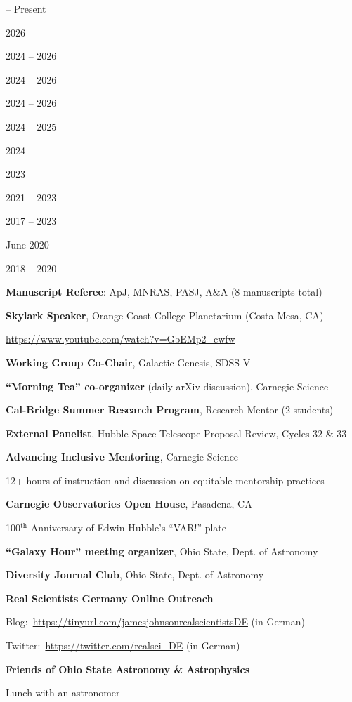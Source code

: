 \documentclass[cv.tex]{subfiles}
\begin{document}
\parbox{0.18\textwidth}{%
	 -- Present \par
	2026 \par
	\null \par
	2024 -- 2026 \par
	2024 -- 2026 \par
	2024 -- 2026 \par
	2024 -- 2025 \par
	2024 \par
	\null \par
	2023 \par
	\null \par
	2021 -- 2023 \par
	2017 -- 2023 \par
	June 2020 \par
	\null \par
	\null \par
	2018 -- 2020 \par
	\null \par
}
\hspace{1mm}
\parbox{0.8\textwidth}{%
	\textbf{Manuscript Referee}: ApJ, MNRAS, PASJ, A\&A (8 manuscripts total)
	\par
	\textbf{Skylark Speaker}, Orange Coast College Planetarium (Costa Mesa, CA)
	\par
	\url{https://www.youtube.com/watch?v=GbEMp2_cwfw} \par
	\textbf{Working Group Co-Chair}, Galactic Genesis, SDSS-V
	\par
	\textbf{``Morning Tea'' co-organizer} (daily arXiv discussion), Carnegie
	Science \par
	\textbf{Cal-Bridge Summer Research Program}, Research Mentor (2 students)
	\par
	\textbf{External Panelist}, Hubble Space Telescope Proposal Review, Cycles
	32 \& 33 \par
	\textbf{Advancing Inclusive Mentoring}, Carnegie Science \par
	12+ hours of instruction and discussion on equitable mentorship practices
	\par
	\textbf{Carnegie Observatories Open House}, Pasadena, CA \par
	100$^\text{th}$ Anniversary of Edwin Hubble's ``VAR!'' plate \par
	\textbf{``Galaxy Hour'' meeting organizer}, Ohio State, Dept. of Astronomy
	\par
	\textbf{Diversity Journal Club}, Ohio State, Dept. of Astronomy \par
	\textbf{Real Scientists Germany Online Outreach} \par
	Blog:~\url{https://tinyurl.com/jamesjohnsonrealscientistsDE} (in German) \par
	Twitter:~\url{https://twitter.com/realsci_DE} (in German) \par
	\textbf{Friends of Ohio State Astronomy \& Astrophysics} \par
	Lunch with an astronomer \par
}
\end{document}
